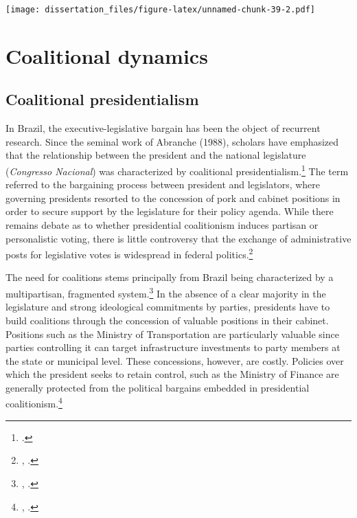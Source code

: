 \documentclass[12pt,]{book}
\let\rmarkdownfootnote\footnote%
\def\footnote{\protect\rmarkdownfootnote}
\begin{document}
\texttt{[image: dissertation\_files/figure-latex/unnamed-chunk-39-2.pdf]}

\hypertarget{coalitional-dynamics}{%
\chapter{Coalitional dynamics}\label{coalitional-dynamics}}

\hypertarget{coalitional-presidentialism}{%
\section{Coalitional presidentialism}\label{coalitional-presidentialism}}

In Brazil, the executive-legislative bargain has been the object of recurrent research. Since the seminal work of Abranche (1988), scholars have emphasized that the relationship between the president and the national legislature (\emph{Congresso Nacional}) was characterized by coalitional presidentialism.\footnote{\citet{power_optimism_2010}.} The term referred to the bargaining process between president and legislators, where governing presidents resorted to the concession of pork and cabinet positions in order to secure support by the legislature for their policy agenda. While there remains debate as to whether presidential coalitionism induces partisan or personalistic voting, there is little controversy that the exchange of administrative posts for legislative votes is widespread in federal politics.\footnote{\citet{figueiredo_presidential_2000}, \citet{raile_executive_2011}.}

The need for coalitions stems principally from Brazil being characterized by a multipartisan, fragmented system.\footnote{\citet{mainwaring_rethinking_1999}, \citet{samuels_presidentialized_2002}.} In the absence of a clear majority in the legislature and strong ideological commitments by parties, presidents have to build coalitions through the concession of valuable positions in their cabinet. Positions such as the Ministry of Transportation are particularly valuable since parties controlling it can target infrastructure investments to party members at the state or municipal level. These concessions, however, are costly. Policies over which the president seeks to retain control, such as the Ministry of Finance are generally protected from the political bargains embedded in presidential coalitionism.\footnote{\citet{batista_o_2013}, \citet{loureiro_politica_1999}.}
\end{document}
